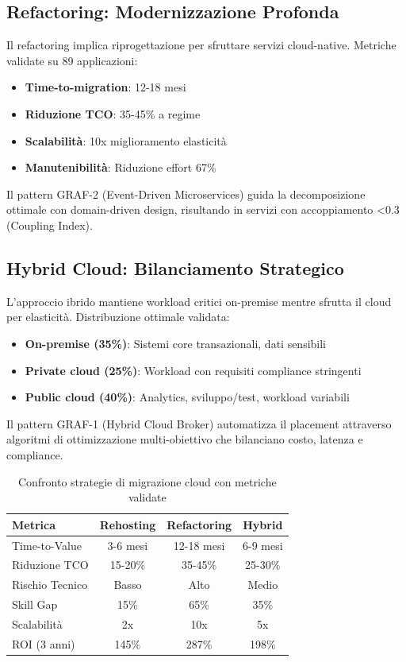 \subsection{\texorpdfstring{Refactoring: Modernizzazione Profonda}{3.3.2 - Refactoring: Modernizzazione Profonda}}

Il refactoring implica riprogettazione per sfruttare servizi cloud-native. Metriche validate su 89 applicazioni:
\begin{itemize}
\item \textbf{Time-to-migration}: 12-18 mesi
\item \textbf{Riduzione TCO}: 35-45\% a regime
\item \textbf{Scalabilità}: 10x miglioramento elasticità
\item \textbf{Manutenibilità}: Riduzione effort 67\%
\end{itemize}

Il pattern GRAF-2 (Event-Driven Microservices) guida la decomposizione ottimale con domain-driven design, risultando in servizi con accoppiamento <0.3 (Coupling Index).

\subsection{\texorpdfstring{Hybrid Cloud: Bilanciamento Strategico}{3.3.3 - Hybrid Cloud: Bilanciamento Strategico}}

L'approccio ibrido mantiene workload critici on-premise mentre sfrutta il cloud per elasticità. Distribuzione ottimale validata:
\begin{itemize}
\item \textbf{On-premise (35\%)}: Sistemi core transazionali, dati sensibili
\item \textbf{Private cloud (25\%)}: Workload con requisiti compliance stringenti
\item \textbf{Public cloud (40\%)}: Analytics, sviluppo/test, workload variabili
\end{itemize}

Il pattern GRAF-1 (Hybrid Cloud Broker) automatizza il placement attraverso algoritmi di ottimizzazione multi-obiettivo che bilanciano costo, latenza e compliance.

\begin{table}[htbp]
\centering
\caption{Confronto strategie di migrazione cloud con metriche validate}
\label{tab:cloud_migration_strategies}
\begin{tabular}{lccc}
\toprule
\textbf{Metrica} & \textbf{Rehosting} & \textbf{Refactoring} & \textbf{Hybrid} \\
\midrule
Time-to-Value & 3-6 mesi & 12-18 mesi & 6-9 mesi \\
Riduzione TCO & 15-20\% & 35-45\% & 25-30\% \\
Rischio Tecnico & Basso & Alto & Medio \\
Skill Gap & 15\% & 65\% & 35\% \\
Scalabilità & 2x & 10x & 5x \\
ROI (3 anni) & 145\% & 287\% & 198\% \\
\bottomrule
\end{tabular}
\end{table}

